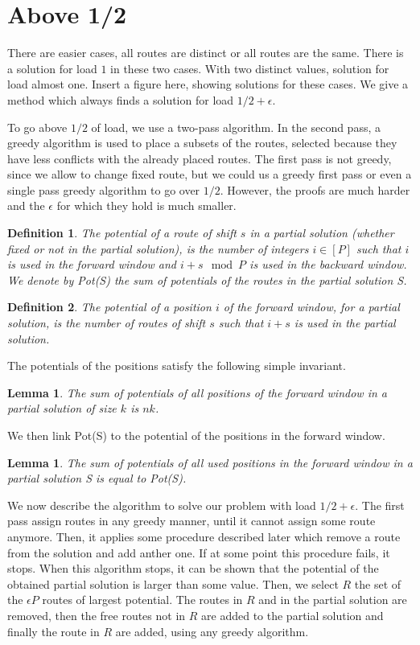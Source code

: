 \documentclass[10pt, conference, letterpaper]{IEEEtran}
\newtheorem{lemma}[theorem]{Lemma}
\newtheorem{definition}{Definition}
\begin{document}
\section{Above 1/2}


There are easier cases, all routes are distinct or all routes are the same. There is a solution for load $1$ in these two cases. With two distinct values, solution for load almost one. Insert a figure here, showing solutions
for these cases.
We  give a method which always finds a solution for load $1/2 + \epsilon$.


To go above $1/2$ of load, we use a two-pass algorithm. In the second pass, a greedy algorithm is used 
to place a subsets of the routes, selected because they have less conflicts with the already placed 
routes. The first pass is not greedy, since we allow to change fixed route, but we could us a greedy first
pass or even a single pass greedy algorithm to go over $1/2$. However, the proofs are much harder and 
the $\epsilon$ for which they hold is much smaller.

\begin{definition}
The potential of a route of shift $s$ in a partial solution (whether fixed or not in the partial solution),
is the number of integers $i \in [P]$ such that $i$ is used in the forward window and $i+s \mod P$ is used in the backward window. We denote by Pot(S) the sum of potentials of the routes in the partial solution S.
\end{definition} 


\begin{definition}
The potential of a position $i$ of the forward window, for a partial solution, is the number of routes of shift $s$ such that $i+s$ is used in the partial solution. 
\end{definition}

The potentials of the positions satisfy the following simple invariant.
\begin{lemma}\label{lemma:inv}
The sum of potentials of all positions of the forward window in a partial solution of size $k$ is $nk$.  
\end{lemma}

We then link Pot(S) to the potential of the positions in the forward window.
\begin{lemma}\label{lemma:pot_pos}
The sum of potentials of all used positions in the forward window in a partial solution S is equal to Pot(S).  
\end{lemma}
 

We now describe the algorithm to solve our problem with load $1/2 + \epsilon$. The first pass assign routes in any
greedy manner, until it cannot assign some route anymore. Then, it applies some procedure described later which 
remove a route from the solution and add anther one. If at some point this procedure fails, it stops.
When this algorithm stops, it can be shown that the potential of the obtained partial solution is larger
than some value. Then, we select $R$ the set of the $\epsilon P$ routes of largest potential. The routes in $R$ and in the partial solution are removed, then the free routes not in $R$ are added to the partial solution and 
finally the route in $R$ are added, using any greedy algorithm.
\end{document}
